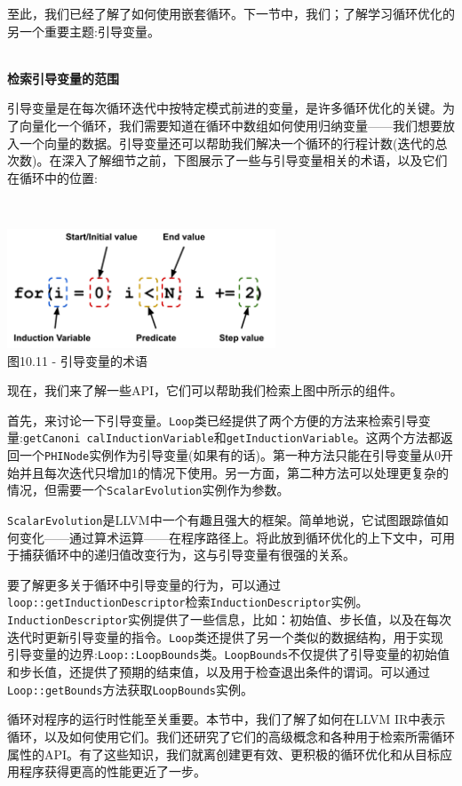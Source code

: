 至此，我们已经了解了如何使用嵌套循环。下一节中，我们；了解学习循环优化的另一个重要主题:引导变量。

\hspace*{\fill} \\ %
\noindent
\textbf{检索引导变量的范围}

引导变量是在每次循环迭代中按特定模式前进的变量，是许多循环优化的关键。为了向量化一个循环，我们需要知道在循环中数组如何使用归纳变量——我们想要放入一个向量的数据。引导变量还可以帮助我们解决一个循环的行程计数(迭代的总次数)。在深入了解细节之前，下图展示了一些与引导变量相关的术语，以及它们在循环中的位置:

\hspace*{\fill} \\ %
\begin{center}
\includegraphics[width=0.6\textwidth]{content/3/chapter10/images/11.png}\\
图10.11 - 引导变量的术语
\end{center}

现在，我们来了解一些API，它们可以帮助我们检索上图中所示的组件。

首先，来讨论一下引导变量。\texttt{Loop}类已经提供了两个方便的方法来检索引导变量:\texttt{getCanoni calInductionVariable}和\texttt{getInductionVariable}。这两个方法都返回一个\texttt{PHINode}实例作为引导变量(如果有的话)。第一种方法只能在引导变量从0开始并且每次迭代只增加1的情况下使用。另一方面，第二种方法可以处理更复杂的情况，但需要一个\texttt{ScalarEvolution}实例作为参数。

\texttt{ScalarEvolution}是LLVM中一个有趣且强大的框架。简单地说，它试图跟踪值如何变化——通过算术运算——在程序路径上。将此放到循环优化的上下文中，可用于捕获循环中的递归值改变行为，这与引导变量有很强的关系。

要了解更多关于循环中引导变量的行为，可以通过\texttt{loop::getInductionDescriptor}检索\texttt{InductionDescriptor}实例。\texttt{InductionDescriptor}实例提供了一些信息，比如：初始值、步长值，以及在每次迭代时更新引导变量的指令。\texttt{Loop}类还提供了另一个类似的数据结构，用于实现引导变量的边界:\texttt{Loop::LoopBounds}类。\texttt{LoopBounds}不仅提供了引导变量的初始值和步长值，还提供了预期的结束值，以及用于检查退出条件的谓词。可以通过\texttt{Loop::getBounds}方法获取\texttt{LoopBounds}实例。

循环对程序的运行时性能至关重要。本节中，我们了解了如何在LLVM IR中表示循环，以及如何使用它们。我们还研究了它们的高级概念和各种用于检索所需循环属性的API。有了这些知识，我们就离创建更有效、更积极的循环优化和从目标应用程序获得更高的性能更近了一步。













